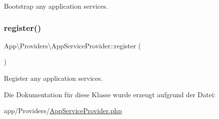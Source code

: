 Bootstrap any application services. \mbox{\label{classApp_1_1Providers_1_1AppServiceProvider_a2853e71d5b5c0d013d755b0265da3a9f}} 
\subsubsection{\texorpdfstring{register()}{register()}}
{\footnotesize\ttfamily App\textbackslash{}\+Providers\textbackslash{}\+App\+Service\+Provider\+::register (\begin{DoxyParamCaption}{ }\end{DoxyParamCaption})}

Register any application services. 

Die Dokumentation für diese Klasse wurde erzeugt aufgrund der Datei\+:\begin{DoxyCompactItemize}
\item 
app/\+Providers/\hyperlink{AppServiceProvider_8php}{App\+Service\+Provider.\+php}\end{DoxyCompactItemize}
